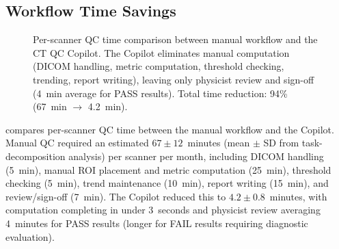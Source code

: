 \documentclass[11pt]{article}
\begin{document}
\subsection{Workflow Time Savings}

\begin{figure}[t]
\centering
{}
\caption{%
  Per-scanner QC time comparison between manual workflow and the
  CT QC Copilot.
  The Copilot eliminates manual computation (DICOM handling, metric
  computation, threshold checking, trending, report writing),
  leaving only physicist review and sign-off (4~min average for
  PASS results).
  Total time reduction: 94\% (67~min $\to$ 4.2~min).
}
\label{fig:time_comparison}
\end{figure}

 compares per-scanner QC time between
the manual workflow and the Copilot.
Manual QC required an estimated $67 \pm 12$~minutes (mean $\pm$ SD
from task-decomposition analysis) per scanner per month, including DICOM handling (5~min), manual ROI placement
and metric computation (25~min), threshold checking (5~min),
trend maintenance (10~min), report writing (15~min), and
review/sign-off (7~min).
The Copilot reduced this to $4.2 \pm 0.8$~minutes, with computation
completing in under 3~seconds and physicist review averaging 4~minutes
for PASS results (longer for FAIL results requiring diagnostic
evaluation).
\end{document}
